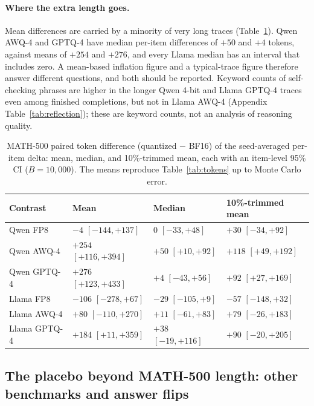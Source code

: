 \documentclass[11pt,a4paper]{article}
\begin{document}
\paragraph{Where the extra length goes.} Mean differences are carried by a minority of very long traces (Table~\ref{tab:toklocation}). Qwen AWQ-4 and GPTQ-4 have median per-item differences of $+50$ and $+4$ tokens, against means of $+254$ and $+276$, and every Llama median has an interval that includes zero. A mean-based inflation figure and a typical-trace figure therefore answer different questions, and both should be reported. Keyword counts of self-checking phrases are higher in the longer Qwen 4-bit and Llama GPTQ-4 traces even among finished completions, but not in Llama AWQ-4 (Appendix Table~\ref{tab:reflection}); these are keyword counts, not an analysis of reasoning quality.

\begin{table}[t]
\centering
\caption{MATH-500 paired token difference (quantized $-$ BF16) of the seed-averaged per-item delta: mean, median, and 10\%-trimmed mean, each with an item-level 95\% CI ($B=10{,}000$). The means reproduce Table~\ref{tab:tokens} up to Monte Carlo error.}
\label{tab:toklocation}
\small
\begin{tabular}{llll}
\toprule
\textbf{Contrast} & \textbf{Mean} & \textbf{Median} & \textbf{10\%-trimmed mean} \\
\midrule
Qwen FP8 & $-4$ $[-144,+137]$ & $0$ $[-33,+48]$ & $+30$ $[-34,+92]$ \\
Qwen AWQ-4 & $+254$ $[+116,+394]$ & $+50$ $[+10,+92]$ & $+118$ $[+49,+192]$ \\
Qwen GPTQ-4 & $+276$ $[+123,+433]$ & $+4$ $[-43,+56]$ & $+92$ $[+27,+169]$ \\
\midrule
Llama FP8 & $-106$ $[-278,+67]$ & $-29$ $[-105,+9]$ & $-57$ $[-148,+32]$ \\
Llama AWQ-4 & $+80$ $[-110,+270]$ & $+11$ $[-61,+83]$ & $+79$ $[-26,+183]$ \\
Llama GPTQ-4 & $+184$ $[+11,+359]$ & $+38$ $[-19,+116]$ & $+90$ $[-20,+205]$ \\
\bottomrule
\end{tabular}
\end{table}

\subsection{The placebo beyond MATH-500 length: other benchmarks and answer flips}
\label{sec:generalise}
\end{document}
